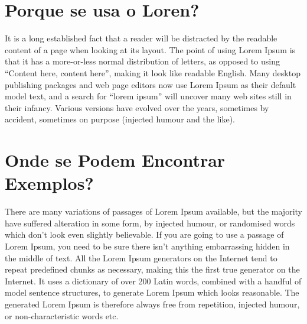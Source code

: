 \section{Porque se usa o Loren?}

It is a long established fact that a reader will be distracted by the
readable content of a page when looking at its layout. The point of
using Lorem Ipsum is that it has a more-or-less normal distribution of
letters, as opposed to using ``Content here, content here'', making it
look like readable English. Many desktop publishing packages and web
page editors now use Lorem Ipsum as their default model text, and a
search for ``lorem ipsum'' will uncover many web sites still in their
infancy. Various versions have evolved over the years, sometimes by
accident, sometimes on purpose (injected humour and the like). 

\section{Onde se Podem Encontrar Exemplos?}

There are many variations of passages of Lorem Ipsum available, but
the majority have suffered alteration in some form, by injected
humour, or randomised words which don't look even slightly
believable. If you are going to use a passage of Lorem Ipsum, you need
to be sure there isn't anything embarrassing hidden in the middle of
text. All the Lorem Ipsum generators on the Internet tend to repeat
predefined chunks as necessary, making this the first true generator
on the Internet. It uses a dictionary of over 200 Latin words,
combined with a handful of model sentence structures, to generate
Lorem Ipsum which looks reasonable. The generated Lorem Ipsum is
therefore always free from repetition, injected humour, or
non-characteristic words etc. 
